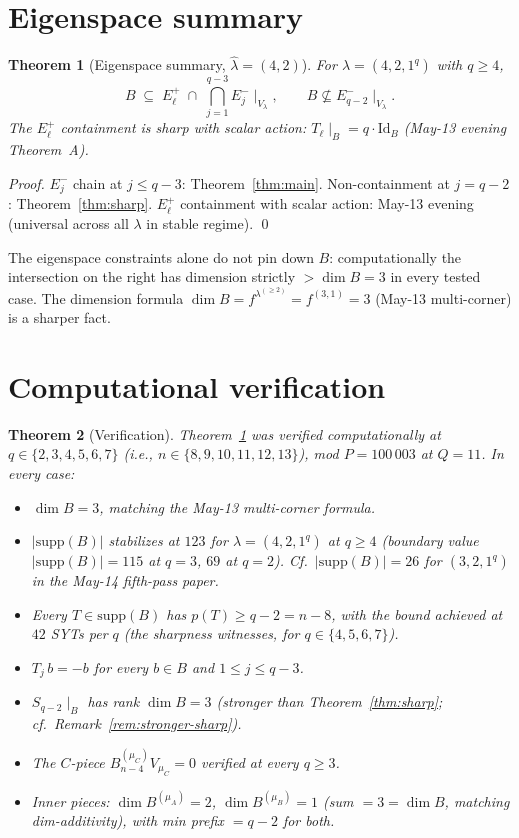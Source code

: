 \documentclass[11pt]{article}
\newtheorem{theorem}{Theorem}
\theoremstyle{definition}
\newcommand{\hatl}{\widehat\lambda}
\newcommand{\supp}{\mathrm{supp}}
\begin{document}
\section{Eigenspace summary}\label{sec:summary}

\begin{theorem}[Eigenspace summary, $\hatl = (4, 2)$]\label{thm:summary}
For $\lambda = (4, 2, 1^q)$ with $q \ge 4$,
\[
   B \;\subseteq\; E_\ell^+\;\cap\;\bigcap_{j=1}^{q-3} E_j^-\!\mid_{V_\lambda},
   \qquad
   B \not\subseteq E_{q-2}^-\!\mid_{V_\lambda}.
\]
The $E_\ell^+$ containment is sharp with scalar action: $T_\ell\!\mid_B
= q\!\cdot\!\mathrm{Id}_B$ (May-13 evening Theorem~A).
\end{theorem}

\begin{proof}
$E_j^-$ chain at $j \le q - 3$: Theorem~\ref{thm:main}.
Non-containment at $j = q - 2$: Theorem~\ref{thm:sharp}.
$E_\ell^+$ containment with scalar action: May-13 evening (universal
across all $\lambda$ in stable regime).
\qed
\end{proof}

The eigenspace constraints alone do not pin down $B$: computationally
the intersection on the right has dimension strictly $> \dim B = 3$
in every tested case.  The dimension formula
$\dim B = f^{\lambda^{(\ge 2)}} = f^{(3, 1)} = 3$ (May-13
multi-corner) is a sharper fact.

\section{Computational verification}\label{sec:verify}

\begin{theorem}[Verification]\label{thm:verify}
Theorem~\ref{thm:summary} was verified computationally at $q \in
\{2, 3, 4, 5, 6, 7\}$ (i.e., $n \in \{8, 9, 10, 11, 12, 13\}$),
mod $P = 100\,003$ at $Q = 11$.  In every case:
\begin{itemize}[topsep=0.3em,itemsep=0.1em]
\item $\dim B = 3$, matching the May-13 multi-corner formula.
\item $|\supp(B)|$ stabilizes at $123$ for $\lambda = (4, 2, 1^q)$
   at $q \ge 4$ (boundary value $|\supp(B)| = 115$ at $q = 3$,
   $69$ at $q = 2$).  Cf.\ $|\supp(B)| = 26$ for $(3, 2, 1^q)$ in
   the May-14 fifth-pass paper.
\item Every $T \in \supp(B)$ has $p(T) \ge q - 2 = n - 8$, with the
   bound achieved at $42$ SYTs per $q$ (the sharpness witnesses,
   for $q \in \{4, 5, 6, 7\}$).
\item $T_j\,b = -b$ for every $b \in B$ and $1 \le j \le q - 3$.
\item $S_{q-2}\!\mid_B$ has rank $\dim B = 3$ (stronger than
   Theorem~\ref{thm:sharp}; cf.\ Remark~\ref{rem:stronger-sharp}).
\item The $C$-piece $B_{n-4}^{(\mu_C)} V_{\mu_C} = 0$ verified
   at every $q \ge 3$.
\item Inner pieces: $\dim B^{(\mu_A)} = 2$, $\dim B^{(\mu_B)} = 1$
   (sum $= 3 = \dim B$, matching dim-additivity), with min prefix
   $= q - 2$ for both.
\end{itemize}
\end{theorem}
\end{document}
